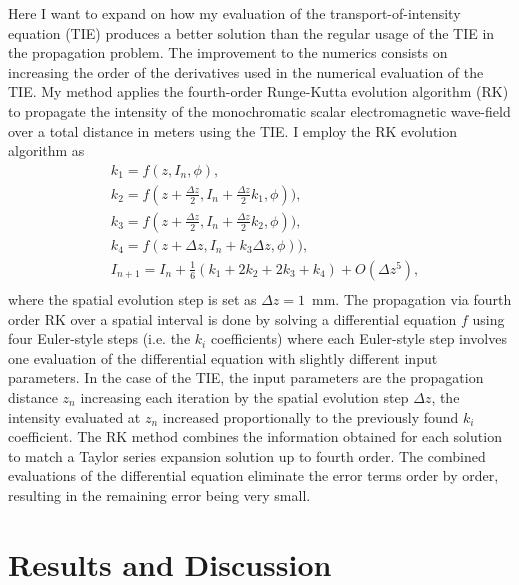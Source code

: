 \documentclass[10pt, a4paper, singlespacing]{report}
\begin{document}
Here I want to expand on how my evaluation of the transport-of-intensity equation (TIE) produces a better solution than the regular usage of the TIE in the propagation problem.
The improvement to the numerics consists on increasing the order of the derivatives used in the numerical evaluation of the TIE. My method applies the fourth-order Runge-Kutta evolution algorithm (RK) to propagate the intensity of the monochromatic scalar electromagnetic wave-field over a total distance in meters using the TIE. I employ the RK evolution algorithm as
\begin{equation} \label{eq:17}
\begin{split}
&k_1 = f(z, I_n, \phi),\\
&k_2 = f(z + \frac{\Delta z}{2}, I_n + \frac{\Delta z }{2}k_1, \phi)),\\
&k_3 = f(z + \frac{\Delta z}{2}, I_n + \frac{\Delta z }{2}k_2, \phi)),\\
&k_4 = f(z + \Delta z, I_n + k_3 \Delta z, \phi)),\\
&I_{n + 1} = I_{n} + \frac{1}{6}(k_1 + 2k_2 + 2k_3 + k_4) + O(\Delta z^5),\\
\end{split}
\end{equation}
where the spatial evolution step is set as $\Delta z = 1$~mm. The propagation via fourth order RK over a spatial interval is done by solving a differential equation $f$ using four Euler-style steps (i.e. the $k_i$ coefficients) where each Euler-style step involves one evaluation of the differential equation with slightly different input parameters. In the case of the TIE, the input parameters are the propagation distance $z_n$ increasing each iteration by the spatial evolution step $\Delta z$, the intensity evaluated at $z_n$ increased proportionally to the previously found $k_i$ coefficient. The RK method combines the information obtained for each solution to match a Taylor series expansion solution up to fourth order. The combined evaluations of the differential equation eliminate the error terms order by order, resulting in the remaining error being very small\cite{N_R}.


\section{Results and Discussion}\label{Results}
\end{document}
